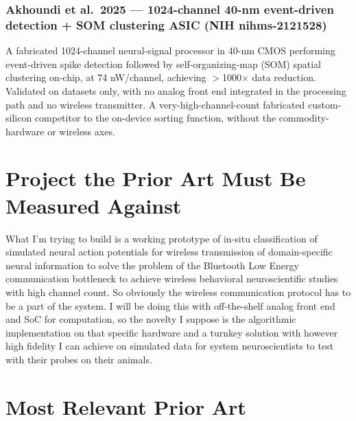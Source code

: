 \documentclass[11pt]{article}
\begin{document}
\subsubsection*{Akhoundi et al.\ 2025 --- 1024-channel 40-nm event-driven detection + SOM clustering ASIC (NIH nihms-2121528)}
A fabricated 1024-channel neural-signal processor in 40-nm CMOS performing event-driven spike detection followed by self-organizing-map (SOM) spatial clustering on-chip, at 74 nW/channel, achieving $>$1000$\times$ data reduction. Validated on datasets only, with no analog front end integrated in the processing path and no wireless transmitter. A very-high-channel-count fabricated custom-silicon competitor to the on-device sorting function, without the commodity-hardware or wireless axes.

\section*{Project the Prior Art Must Be Measured Against}

What I'm trying to build is a working prototype of in-situ classification of simulated neural action potentials for wireless transmission of domain-specific neural information to solve the problem of the Bluetooth Low Energy communication bottleneck to achieve wireless behavioral neuroscientific studies with high channel count. So obviously the wireless communication protocol has to be a part of the system. I will be doing this with off-the-shelf analog front end and SoC for computation, so the novelty I suppose is the algorithmic implementation on that specific hardware and a turnkey solution with however high fidelity I can achieve on simulated data for system neuroscientists to test with their probes on their animals.

\section*{Most Relevant Prior Art}
\end{document}
